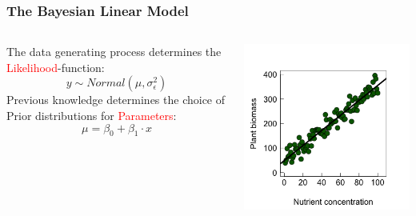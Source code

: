 \documentclass{beamer}
\begin{document}
\begin{frame}
    \frametitle{The Bayesian Linear Model}
    \begin{columns}
        \begin{column}{0.4\textwidth}
            The data generating process determines the \textcolor{red}{Likelihood}-function:
            \[
            y \sim Normal(\mu, \sigma_\epsilon^2)
            \]
            Previous knowledge determines the choice of Prior distributions for \textcolor{red}{Parameters}:
            \[
            \mu = \beta_0 + \beta_1 \cdot x
            \]
        \end{column}
        \begin{column}{0.6\textwidth}
            \includegraphics[width=\textwidth]{lectures/day_11_bayesian_lm/figures/unnamed-chunk-5-1.png}
        \end{column}
    \end{columns}
\end{frame}
\end{document}
